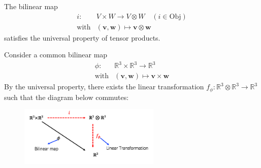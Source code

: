 \begin{theorem}\label{The:12:3}
The bilinear map
\[
\begin{array}{ll}
i:&V\times W\to V\otimes W\quad(i\in\text{Obj})\\
\text{with}&(\bm v,\bm w)\mapsto\bm v\otimes\bm w
\end{array}
\]
satisfies the universal property of tensor products.
\end{theorem}
\begin{example}
Consider a common bilinear map
\[
\begin{array}{ll}
\phi:&\mathbb{R}^3\times \mathbb{R}^3\to\mathbb{R}^3\\
\text{with}&(\bm v,\bm w)\mapsto\bm v\times\bm w
\end{array}
\]
By the universal property, there exists the linear transformation $f_{\phi}:\mathbb{R}^3\otimes\mathbb{R}^3\to\mathbb{R}^3$
such that the diagram below commutes:
\begin{figure}[H]
\centering
\includegraphics[width=0.6\textwidth]{week12/f_12_2}
\end{figure}
\end{example}













